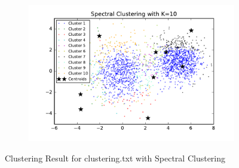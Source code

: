 \begin{description}
\begin{description}
\begin{figure}[!h]
\begin{subfigure}[b]{0.475\textwidth}
        \end{subfigure}
        \hfill
        \begin{subfigure}[b]{0.475\textwidth}   
            \centering 
            \includegraphics[width=\textwidth]{./figures/clustering_spectral_10.pdf}
        \end{subfigure}
        
        \caption{Clustering Result for clustering.txt with Spectral Clustering}
        \label{fig:spectral_clustering}
\end{figure}


\end{description}
\end{description}
